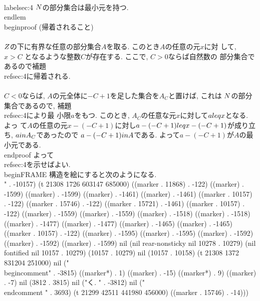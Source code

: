  \\label{sec:4}
 $\\N$の部分集合は最小元を持つ.
\\end{lem}
\\begin{proof}
 (帰着されること)\\\\
 $\\Z$の下に有界な任意の部分集合$A$を取る. このとき$A$の任意の元$x$に対
 して, $x>C$ となるような整数$C$が存在する. ここで, $C>0$ならば自然数の
 部分集合であるので補題 \\ref{sec:4}に帰着される.\\\\
 $C<0$ならば, $A$の元全体に$-C+1$を足した集合を$A_C$と置けば, これは
 $\\N$の部分集合であるので, 補題\\ref{sec:4}により最
 小限$a$をもつ. このとき, $A_C$の任意な元$x$に対して$a\\leq x$となる. よっ
 て$A$の任意の元$x-(-C+1)$に対し$a-(-C+1)\\leq  x-(-C+1)$が成り立ち,
 $a\\in A_C$であったので $a-(-C+1)\\in A$である. よって$a-(-C+1)$が$A$の最
 小元である.
\\end{proof}
よって\\ref{sec:4}を示せばよい. 
\\begin{FRAME}
 構造を絵にすると次のようになる.
 \\[
 \\xymatrix{
 \\text{命題\\ref{sec:1}}\\ar@(r,r)@{=>}[d]\\\\
 \\text{命題\\ref{sec:3}}\\ar@(l,l)@{=>}[u]\\\\
 \\text{補題\\ref{sec:4}}\\ar@{=>}[u]
 }
 \\]
" . -10157) (t 21308 1726 603147 685000) ((marker . 11868) . -122) ((marker) . -1599) ((marker) . -1599) ((marker) . -1461) ((marker) . -1461) ((marker . 10157) . -122) ((marker . 15746) . -122) ((marker . 15721) . -1461) ((marker . 10157) . -122) ((marker) . -1559) ((marker) . -1559) ((marker) . -1518) ((marker) . -1518) ((marker) . -1477) ((marker) . -1477) ((marker) . -1465) ((marker) . -1465) ((marker . 10157) . -122) ((marker) . -1595) ((marker) . -1595) ((marker) . -1592) ((marker) . -1592) ((marker) . -1599) nil (nil rear-nonsticky nil 10278 . 10279) (nil fontified nil 10157 . 10279) (10157 . 10279) nil (10157 . 10158) (t 21308 1372 831204 251000) nil ("\\begin{comment}" . -3815) ((marker*) . 1) ((marker) . -15) ((marker*) . 9) ((marker) . -7) nil (3812 . 3815) nil ("く.
" . -3812) nil ("\\end{comment}
" . 3693) (t 21299 42511 441980 456000) ((marker . 15746) . -14)))
